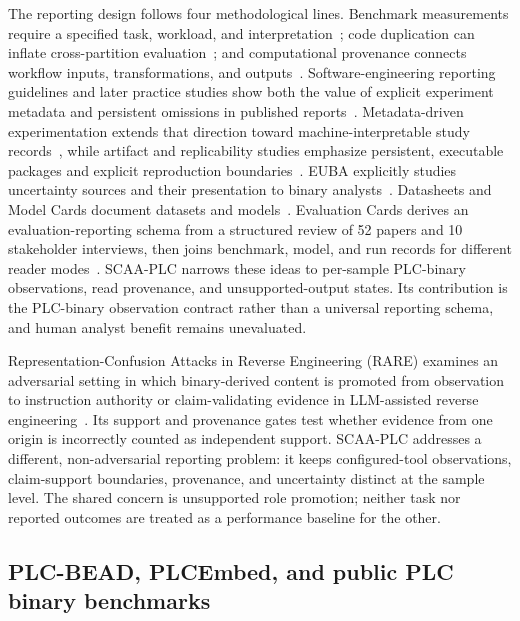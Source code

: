 \documentclass[manuscript,screen,review]{acmart}
\begin{document}
The reporting design follows four methodological lines. Benchmark measurements require a specified task, workload, and interpretation~\cite{sim_benchmarking2003}; code duplication can inflate cross-partition evaluation~\cite{allamanis2019adverse}; and computational provenance connects workflow inputs, transformations, and outputs~\cite{freire_provenance2008}. Software-engineering reporting guidelines and later practice studies show both the value of explicit experiment metadata and persistent omissions in published reports~\cite{kitchenham_reporting2008,revoredo_reporting2021}. Metadata-driven experimentation extends that direction toward machine-interpretable study records~\cite{santana_metadata2026}, while artifact and replicability studies emphasize persistent, executable packages and explicit reproduction boundaries~\cite{heumueller_software_artifacts2020,olszewski_replicability2025}. EUBA explicitly studies uncertainty sources and their presentation to binary analysts~\cite{euba_sandia2021}. Datasheets and Model Cards document datasets and models~\cite{datasheets_for_datasets,model_cards}. Evaluation Cards derives an evaluation-reporting schema from a structured review of 52 papers and 10 stakeholder interviews, then joins benchmark, model, and run records for different reader modes~\cite{evaluation_cards_arxiv2026}. SCAA-PLC narrows these ideas to per-sample PLC-binary observations, read provenance, and unsupported-output states. Its contribution is the PLC-binary observation contract rather than a universal reporting schema, and human analyst benefit remains unevaluated.

Representation-Confusion Attacks in Reverse Engineering (RARE) examines an adversarial setting in which binary-derived content is promoted from observation to instruction authority or claim-validating evidence in LLM-assisted reverse engineering~\cite{santos_grueiro_rare2026}. Its support and provenance gates test whether evidence from one origin is incorrectly counted as independent support. SCAA-PLC addresses a different, non-adversarial reporting problem: it keeps configured-tool observations, claim-support boundaries, provenance, and uncertainty distinct at the sample level. The shared concern is unsupported role promotion; neither task nor reported outcomes are treated as a performance baseline for the other.

\subsection{PLC-BEAD, PLCEmbed, and public PLC binary benchmarks}
\end{document}
